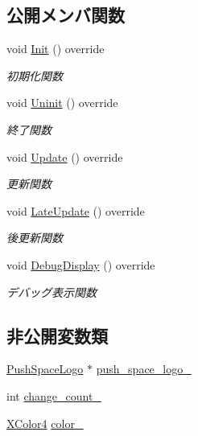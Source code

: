 \subsection*{公開メンバ関数}
\begin{DoxyCompactItemize}
\item 
void \mbox{\hyperlink{class_push_space_logo_update_a9c165604160c012b429c1db1d67ffb2a}{Init}} () override
\begin{DoxyCompactList}\small\item\em 初期化関数 \end{DoxyCompactList}\item 
void \mbox{\hyperlink{class_push_space_logo_update_a94f791874cb6160cd33cd7068fcde0d0}{Uninit}} () override
\begin{DoxyCompactList}\small\item\em 終了関数 \end{DoxyCompactList}\item 
void \mbox{\hyperlink{class_push_space_logo_update_aa07fe6f6f4f072e1f81bc6708dd4727e}{Update}} () override
\begin{DoxyCompactList}\small\item\em 更新関数 \end{DoxyCompactList}\item 
void \mbox{\hyperlink{class_push_space_logo_update_a4423864fb22b1211e92a4317d0b70a44}{Late\+Update}} () override
\begin{DoxyCompactList}\small\item\em 後更新関数 \end{DoxyCompactList}\item 
void \mbox{\hyperlink{class_push_space_logo_update_ab18a0c905455da17f9e2f1fe5f0c34e6}{Debug\+Display}} () override
\begin{DoxyCompactList}\small\item\em デバッグ表示関数 \end{DoxyCompactList}\end{DoxyCompactItemize}
\subsection*{非公開変数類}
\begin{DoxyCompactItemize}
\item 
\mbox{\hyperlink{class_push_space_logo}{Push\+Space\+Logo}} $\ast$ \mbox{\hyperlink{class_push_space_logo_update_ad8880dbcf9117d05da13e0d6630b5952}{push\+\_\+space\+\_\+logo\+\_\+}}
\item 
int \mbox{\hyperlink{class_push_space_logo_update_abb01ae1dcc8858389d98f95509b6dff7}{change\+\_\+count\+\_\+}}
\item 
\mbox{\hyperlink{_vector3_d_8h_a680c30c4a07d86fe763c7e01169cd6cc}{X\+Color4}} \mbox{\hyperlink{class_push_space_logo_update_a5a8bff1192b24c515b8b4dc753e39cd1}{color\+\_\+}}
\end{DoxyCompactItemize}
